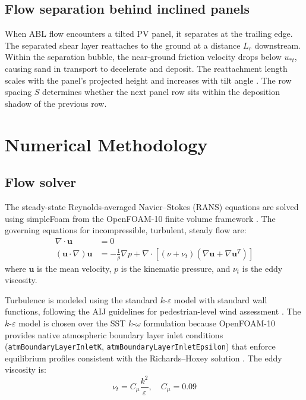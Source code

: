 \documentclass[preprint,12pt,review]{elsarticle}
\begin{document}
\subsection{Flow separation behind inclined panels}

When ABL flow encounters a tilted PV panel, it separates at the trailing edge. The separated shear layer reattaches to the ground at a distance $L_r$ downstream. Within the separation bubble, the near-ground friction velocity drops below $u_{*t}$, causing sand in transport to decelerate and deposit. The reattachment length scales with the panel's projected height and increases with tilt angle \cite{jubayer2016numerical}. The row spacing $S$ determines whether the next panel row sits within the deposition shadow of the previous row.

\section{Numerical Methodology}
\label{sec:method}

\subsection{Flow solver}

The steady-state Reynolds-averaged Navier--Stokes (RANS) equations are solved using simpleFoam from the OpenFOAM-10 finite volume framework \cite{patankar1972calculation}. The governing equations for incompressible, turbulent, steady flow are:
%
\begin{align}
  \nabla \cdot \mathbf{u} &= 0 \label{eq:continuity} \\[4pt]
  (\mathbf{u} \cdot \nabla)\mathbf{u} &= -\frac{1}{\rho}\nabla p + \nabla \cdot \left[(\nu + \nu_t)(\nabla \mathbf{u} + \nabla \mathbf{u}^T)\right]
  \label{eq:momentum}
\end{align}
%
where $\mathbf{u}$ is the mean velocity, $p$ is the kinematic pressure, and $\nu_t$ is the eddy viscosity.

Turbulence is modeled using the standard $k$-$\varepsilon$ model \cite{launder1974application} with standard wall functions, following the AIJ guidelines for pedestrian-level wind assessment \cite{tominaga2008wind}. The $k$-$\varepsilon$ model is chosen over the SST $k$-$\omega$ formulation because OpenFOAM-10 provides native atmospheric boundary layer inlet conditions (\texttt{atmBoundaryLayerInletK}, \texttt{atmBoundaryLayerInletEpsilon}) that enforce equilibrium profiles consistent with the Richards--Hoxey solution \cite{richards1993appropriate}. The eddy viscosity is:
%
\begin{equation}
  \nu_t = C_\mu \frac{k^2}{\varepsilon}, \quad C_\mu = 0.09
  \label{eq:nut}
\end{equation}
\end{document}
